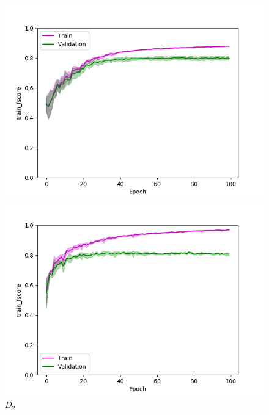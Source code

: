 \def\year{2017}\relax \documentclass[letterpaper]{article}
\begin{document}
\begin{figure}
\centering
\begin{minipage}{.24\textwidth}
  \centering
\includegraphics[width=\textwidth]{pics/d1_train_fscore_mean_train_test.png}
\caption{$D_1$}\label{fig:d1fscoretraintest}
\end{minipage}
\begin{minipage}{.01\textwidth}
\end{minipage}
\begin{minipage}{.24\textwidth}
  \centering
\includegraphics[width=\textwidth]{pics/d2_train_fscore_mean_train_test.png}
\caption{$D_2$}\label{fig:d2fscoretraintest}
\end{minipage}

\end{figure}
\end{document}
